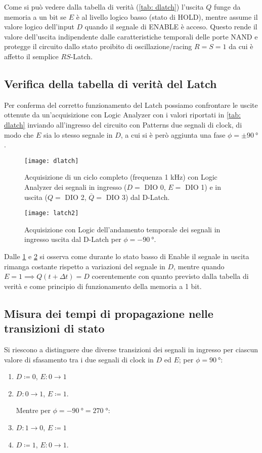 \documentclass[10pt, a4paper, italian]{article}
\begin{document}
Come si può vedere dalla tabella di verità (\cref{tab: dlatch}) l'uscita $Q$
funge da memoria a un bit se $E$ è al livello logico basso (stato di HOLD),
mentre assume il valore logico dell'input $D$ quando il segnale di ENABLE è
acceso.
Questo rende il valore dell'uscita indipendente dalle caratteristiche
temporali delle porte NAND e protegge il circuito dallo stato proibito di
oscillazione/racing $R = S = 1$ da cui è affetto il semplice $RS$-Latch.

\subsection{Verifica della tabella di verità del Latch}
Per conferma del corretto funzionamento del Latch possiamo confrontare
le uscite ottenute da un'acquisizione con Logic Analyzer con i valori
riportati in \cref{tab: dlatch} inviando all'ingresso del circuito con
Patterns due segnali di clock, di modo che $E$ sia lo stesso segnale in $D$,
a cui si è però aggiunta una fase $\phi = \pm \SI{90}{\degree}$.
\begin{figure}[htbp]
    \centering
    \texttt{[image: dlatch]}
    \caption{Acquisizione di un ciclo completo (frequenza 1 kHz) con Logic
    Analyzer dei segnali in ingresso ($D =$ DIO 0, $E =$ DIO 1) e in uscita
    ($Q =$ DIO 2, $\overline{Q} =$ DIO 3) dal D-Latch.
    \label{fig: dlatch}}
\end{figure}
\begin{figure}[htbp]
	\texttt{[image: latch2]}
	\caption{Acquisizione con Logic dell'andamento temporale dei segnali in
	ingresso uscita dal D-Latch per $\phi = -\SI{90}{\degree}$.
	\label{fig: Log_DLATCH2}}
\end{figure}

Dalle \cref{fig: dlatch} e \cref{fig: Log_DLATCH2} si osserva come durante lo
stato basso di Enable il segnale in uscita rimanga costante rispetto a
variazioni del segnale in $D$, mentre quando
$E = 1 \implies Q(t + \Delta t) = D$ coerentemente con quanto previsto dalla
tabella di verità e come principio di funzionamento della memoria a 1 bit.

\subsection{Misura dei tempi di propagazione nelle transizioni di stato}
Si riescono a distinguere due diverse transizioni dei segnali in ingresso per
ciascun valore di sfasamento tra i due segnali di clock in $D$ ed $E$;
per $\phi = \SI{90}{\degree}$:
\begin{enumerate}
\item $D \coloneqq 0$, $E: 0 \to 1$ \label{item: Efall}
\item $D: 0 \to 1$, $E \coloneqq 1$. \label{item: Drise}

Mentre per $\phi = - \SI{90}{\degree} = 270 \; \si{\degree}$:
\item $D: 1 \to 0$, $E \coloneqq 1$ \label{item: Dfall}
\item $D \coloneqq 1$, $E: 0 \to 1$. \label{item: Erise}
\end{enumerate}
\end{document}
